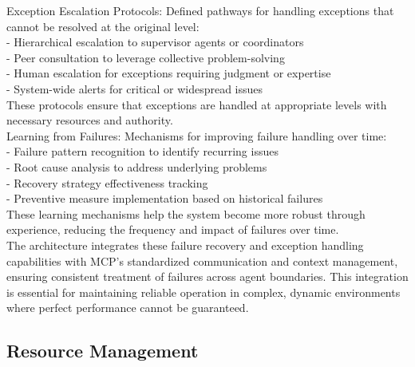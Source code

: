 Exception Escalation Protocols: Defined pathways for handling exceptions that cannot be resolved at the original level:\\ \newline
- Hierarchical escalation to supervisor agents or coordinators\\ \newline
- Peer consultation to leverage collective problem-solving\\ \newline
- Human escalation for exceptions requiring judgment or expertise\\ \newline
- System-wide alerts for critical or widespread issues\\ \newline
These protocols ensure that exceptions are handled at appropriate levels with necessary resources and authority.\\ \newline
Learning from Failures: Mechanisms for improving failure handling over time:\\ \newline
- Failure pattern recognition to identify recurring issues\\ \newline
- Root cause analysis to address underlying problems\\ \newline
- Recovery strategy effectiveness tracking\\ \newline
- Preventive measure implementation based on historical failures\\ \newline
These learning mechanisms help the system become more robust through experience, reducing the frequency and impact of failures over time.\\ \newline
The architecture integrates these failure recovery and exception handling capabilities with MCP's standardized communication and context management, ensuring consistent treatment of failures across agent boundaries. This integration is essential for maintaining reliable operation in complex, dynamic environments where perfect performance cannot be guaranteed.\\
\subsection{Resource Management}
